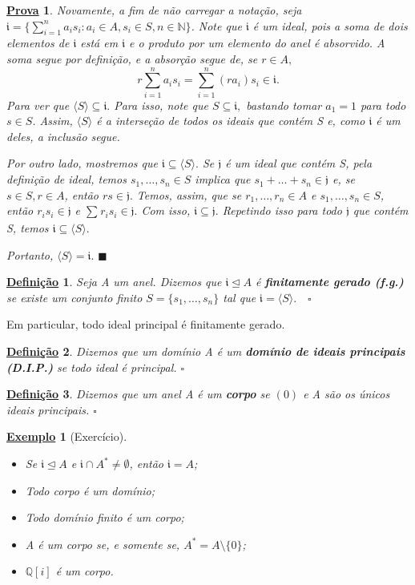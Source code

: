 \documentclass{article}
\newtheorem*{def*}{\underline{Defini\c c\~ao}}
\newtheorem{example}{\underline{Exemplo}}
\newtheorem*{proof*}{\underline{Prova}}
\renewcommand\qedsymbol{$\blacksquare$}
\begin{document}
\begin{proof*}
  Novamente, a fim de não carregar a notação, seja \(\mathfrak{i} = \{\sum\limits_{i=1}^{n}a_{i}s_{i}: a_{i}\in A, s_{i}\in S, n\in \mathbb{N}\}\). Note que
 \(\mathfrak{i}\) é um ideal, pois a soma de dois elementos de \(\mathfrak{i}\) está em \(\mathfrak{i}\) e o produto por um elemento do anel é absorvido.
A soma segue por definição, e a absorção segue de, se \(r\in A,\) 
  \[
    r \sum\limits_{i=1}^{n}a_{i}s_{i} = \sum\limits_{i=1}^{n}(ra_{i})s_{i}\in \mathfrak{i}.
  \]
  Para ver que \(\langle S \rangle \subseteq{\mathfrak{i}}.\) Para isso, note que \(S\subseteq{\mathfrak{i}},\) bastando tomar \(a_{1} = 1\) para todo
 \(s\in S\). Assim, \(\langle S \rangle\) é a interseção de todos os ideais que contém S e, como \(\mathfrak{i}\) é um deles, a inclusão segue.

  Por outro lado, mostremos que \(\mathfrak{i}\subseteq{\langle S \rangle}.\) Se \(\mathfrak{j}\) é um ideal que contém S, pela definição de ideal, 
temos \(s_{1}, \dotsc, s_{n}\in S\) implica que \(s_{1} + \dotsc + s_{n}\in \mathfrak{j}\) e, se \(s\in S, r\in A\), então \(rs\in \mathfrak{j}.\)
Temos, assim, que se \(r_{1}, \dotsc, r_{n}\in A\) e \(s_{1}, \dotsc, s_{n}\in S\), então \(r_{i}s_{i}\in \mathfrak{j}\) e \(\sum\limits_{}^{}r_{i}s_{i}\in \mathfrak{j}.\)
Com isso, \(\mathfrak{i}\subseteq{\mathfrak{j}}.\) Repetindo isso para todo \(\mathfrak{j}\) que contém S, temos \(\mathfrak{i}\subseteq{\langle S \rangle}.\)

  Portanto, \(\langle S \rangle = \mathfrak{i}.\) \qedsymbol
\end{proof*}
\begin{def*}
  Seja A um anel. Dizemos que \(\mathfrak{i} \trianglelefteq{A}\) é \textbf{finitamente gerado (f.g.)} se existe um conjunto finito
 \(S = \{s_{1}, \dotsc, s_{n}\}\) tal que \(\mathfrak{i} = \langle S \rangle.\quad\square\)
\end{def*}
  Em particular, todo ideal principal é finitamente gerado.
\begin{def*}
  Dizemos que um domínio A é um \textbf{domínio de ideais principais (D.I.P.)} se todo ideal é principal. \(\square\)  
\end{def*}
\begin{def*}
  Dizemos que um anel A é um \textbf{corpo} se \((0)\) e A são os únicos ideais principais. \(\square\)
\end{def*}
\begin{example}[Exercício]
\begin{itemize}
\item[1)] Se \(\mathfrak{i}\trianglelefteq{A}\) e \(\mathfrak{i}\cap A^{*}\neq\emptyset\), então \(\mathfrak{i} = A\);
\item[2)] Todo corpo é um domínio;
\item[3)] Todo domínio finito é um corpo;
\item[4)] A é um corpo se, e somente se, \(A^{*} = A \setminus{\{0\}}\);
\item[5)] \(\mathbb{Q}[i]\) é um corpo.
\end{itemize} 
\end{example}
\end{document}
